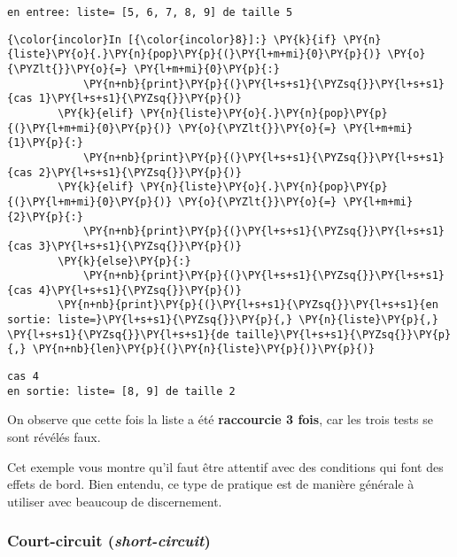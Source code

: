    \begin{Verbatim}[commandchars=\\\{\},frame=single,framerule=0.3mm,rulecolor=\color{cellframecolor}]
en entree: liste= [5, 6, 7, 8, 9] de taille 5
\end{Verbatim}

    \begin{Verbatim}[commandchars=\\\{\},frame=single,framerule=0.3mm,rulecolor=\color{cellframecolor}]
{\color{incolor}In [{\color{incolor}8}]:} \PY{k}{if} \PY{n}{liste}\PY{o}{.}\PY{n}{pop}\PY{p}{(}\PY{l+m+mi}{0}\PY{p}{)} \PY{o}{\PYZlt{}}\PY{o}{=} \PY{l+m+mi}{0}\PY{p}{:}
            \PY{n+nb}{print}\PY{p}{(}\PY{l+s+s1}{\PYZsq{}}\PY{l+s+s1}{cas 1}\PY{l+s+s1}{\PYZsq{}}\PY{p}{)}
        \PY{k}{elif} \PY{n}{liste}\PY{o}{.}\PY{n}{pop}\PY{p}{(}\PY{l+m+mi}{0}\PY{p}{)} \PY{o}{\PYZlt{}}\PY{o}{=} \PY{l+m+mi}{1}\PY{p}{:}
            \PY{n+nb}{print}\PY{p}{(}\PY{l+s+s1}{\PYZsq{}}\PY{l+s+s1}{cas 2}\PY{l+s+s1}{\PYZsq{}}\PY{p}{)}
        \PY{k}{elif} \PY{n}{liste}\PY{o}{.}\PY{n}{pop}\PY{p}{(}\PY{l+m+mi}{0}\PY{p}{)} \PY{o}{\PYZlt{}}\PY{o}{=} \PY{l+m+mi}{2}\PY{p}{:}
            \PY{n+nb}{print}\PY{p}{(}\PY{l+s+s1}{\PYZsq{}}\PY{l+s+s1}{cas 3}\PY{l+s+s1}{\PYZsq{}}\PY{p}{)}
        \PY{k}{else}\PY{p}{:}
            \PY{n+nb}{print}\PY{p}{(}\PY{l+s+s1}{\PYZsq{}}\PY{l+s+s1}{cas 4}\PY{l+s+s1}{\PYZsq{}}\PY{p}{)}
        \PY{n+nb}{print}\PY{p}{(}\PY{l+s+s1}{\PYZsq{}}\PY{l+s+s1}{en sortie: liste=}\PY{l+s+s1}{\PYZsq{}}\PY{p}{,} \PY{n}{liste}\PY{p}{,} \PY{l+s+s1}{\PYZsq{}}\PY{l+s+s1}{de taille}\PY{l+s+s1}{\PYZsq{}}\PY{p}{,} \PY{n+nb}{len}\PY{p}{(}\PY{n}{liste}\PY{p}{)}\PY{p}{)}
\end{Verbatim}


    \begin{Verbatim}[commandchars=\\\{\},frame=single,framerule=0.3mm,rulecolor=\color{cellframecolor}]
cas 4
en sortie: liste= [8, 9] de taille 2
\end{Verbatim}

    On observe que cette fois la liste a été \textbf{raccourcie 3 fois}, car
les trois tests se sont révélés faux.

    Cet exemple vous montre qu'il faut être attentif avec des conditions qui
font des effets de bord. Bien entendu, ce type de pratique est de
manière générale à utiliser avec beaucoup de discernement.

    \hypertarget{court-circuit-short-circuit}{%
\subsubsection{\texorpdfstring{Court-circuit
(\emph{short-circuit})}{Court-circuit (short-circuit)}}\label{court-circuit-short-circuit}}

